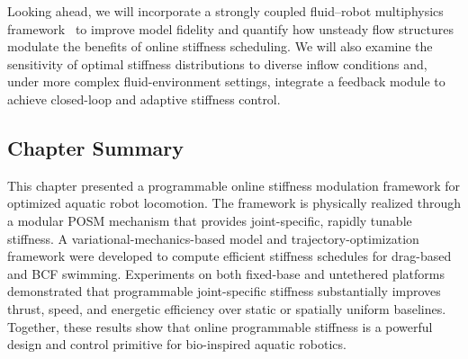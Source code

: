 Looking ahead, we will incorporate a strongly coupled fluid--robot multiphysics framework~\cite{lee2025unifiedframeworksimulatingstronglycoupled} to improve model fidelity and quantify how unsteady flow structures modulate the benefits of online stiffness scheduling. We will also examine the sensitivity of optimal stiffness distributions to diverse inflow conditions and, under more complex fluid-environment settings, integrate a feedback module to achieve closed-loop and adaptive stiffness control.

\subsection{Chapter Summary}

This chapter presented a programmable online stiffness modulation framework for optimized aquatic robot locomotion. The framework is physically realized through a modular POSM mechanism that provides joint-specific, rapidly tunable stiffness. A variational-mechanics-based model and trajectory-optimization framework were developed to compute efficient stiffness schedules for drag-based and BCF swimming. Experiments on both fixed-base and untethered platforms demonstrated that programmable joint-specific stiffness substantially improves thrust, speed, and energetic efficiency over static or spatially uniform baselines. Together, these results show that online programmable stiffness is a powerful design and control primitive for bio-inspired aquatic robotics.
